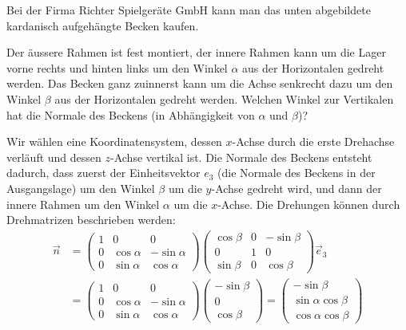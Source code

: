 Bei der Firma Richter Spielgeräte GmbH kann man das unten abgebildete
kardanisch aufgehängte Becken kaufen. 
\begin{center}
\end{center}
Der äussere Rahmen ist fest montiert, der innere Rahmen kann um
die Lager vorne rechts und hinten links um den Winkel $\alpha$
aus der Horizontalen
gedreht werden. Das Becken ganz zuinnerst kann um die Achse
senkrecht dazu um den Winkel $\beta$ aus der Horizontalen gedreht werden.
Welchen
Winkel zur Vertikalen hat die Normale des Beckens (in Abhängigkeit
von $\alpha$ und $\beta$)?


\begin{loesung}
Wir wählen eine Koordinatensystem, dessen $x$-Achse durch die
erste Drehachse verläuft und dessen $z$-Achse vertikal ist.
Die Normale des Beckens entsteht dadurch, dass zuerst der
Einheitsvektor $e_3$ (die Normale des Beckens in der Ausgangslage)
um den Winkel $\beta$ um die $y$-Achse gedreht wird,
und dann der innere Rahmen um den Winkel $\alpha$ um die
$x$-Achse. Die Drehungen können durch Drehmatrizen beschrieben werden:
\begin{align*}
\vec n
&=
\begin{pmatrix}
1&0&0\\
0&\cos\alpha&-\sin\alpha\\
0&\sin\alpha& \cos\alpha
\end{pmatrix}
\begin{pmatrix}
\cos\beta&0&-\sin\beta\\
0&1&0\\
\sin\beta&0&\cos\beta
\end{pmatrix}\vec e_3
\\
&=
\begin{pmatrix}
1&0&0\\
0&\cos\alpha&-\sin\alpha\\
0&\sin\alpha& \cos\alpha
\end{pmatrix}
\begin{pmatrix}
-\sin\beta\\
0\\
\cos\beta
\end{pmatrix}
=
\begin{pmatrix}
-\sin\beta\\
\sin\alpha\cos\beta\\
\cos\alpha\cos\beta
\end{pmatrix}
\end{align*}

\end{loesung}
